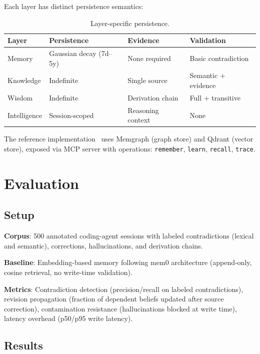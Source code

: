 \documentclass[11pt,letterpaper]{article}
\begin{document}
Each layer has distinct persistence semantics:

\begin{table}[H]
\centering
\caption{Layer-specific persistence.}
\label{tab:persistence}
\begin{tabular}{@{}llll@{}}
\toprule
\textbf{Layer} & \textbf{Persistence} & \textbf{Evidence} & \textbf{Validation} \\
\midrule
Memory & Gaussian decay (7d--5y) & None required & Basic contradiction \\
Knowledge & Indefinite & Single source & Semantic + evidence \\
Wisdom & Indefinite & Derivation chain & Full + transitive \\
Intelligence & Session-scoped & Reasoning context & None \\
\bottomrule
\end{tabular}
\end{table}

The reference implementation~\cite{engrammic2026} uses Memgraph (graph store) and Qdrant (vector store), exposed via MCP server with operations: \texttt{remember}, \texttt{learn}, \texttt{recall}, \texttt{trace}.

\section{Evaluation}
\label{sec:eval}

\subsection{Setup}

\textbf{Corpus}: 500 annotated coding-agent sessions with labeled contradictions (lexical and semantic), corrections, hallucinations, and derivation chains.

\textbf{Baseline}: Embedding-based memory following mem0 architecture (append-only, cosine retrieval, no write-time validation).

\textbf{Metrics}: Contradiction detection (precision/recall on labeled contradictions), revision propagation (fraction of dependent beliefs updated after source correction), contamination resistance (hallucinations blocked at write time), latency overhead (p50/p95 write latency).

\subsection{Results}
\end{document}
